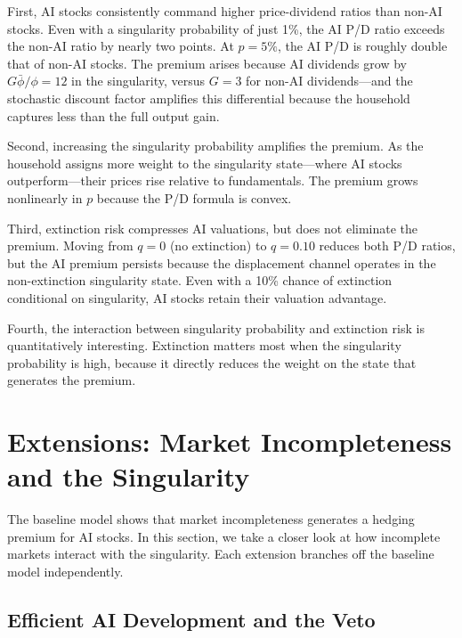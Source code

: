 \documentclass[12pt]{article}
\begin{document}
First, AI stocks consistently command higher price-dividend ratios than non-AI stocks. Even with a singularity probability of just 1\%, the AI P/D ratio exceeds the non-AI ratio by nearly two points. At $p = 5\%$, the AI P/D is roughly double that of non-AI stocks. The premium arises because AI dividends grow by $G\bar{\phi}/\phi = 12$ in the singularity, versus $G = 3$ for non-AI dividends---and the stochastic discount factor amplifies this differential because the household captures less than the full output gain.

Second, increasing the singularity probability amplifies the premium. As the household assigns more weight to the singularity state---where AI stocks outperform---their prices rise relative to fundamentals. The premium grows nonlinearly in $p$ because the P/D formula is convex.

Third, extinction risk compresses AI valuations, but does not eliminate the premium. Moving from $q = 0$ (no extinction) to $q = 0.10$ reduces both P/D ratios, but the AI premium persists because the displacement channel operates in the non-extinction singularity state. Even with a 10\% chance of extinction conditional on singularity, AI stocks retain their valuation advantage.

Fourth, the interaction between singularity probability and extinction risk is quantitatively interesting. Extinction matters most when the singularity probability is high, because it directly reduces the weight on the state that generates the premium.


\section{Extensions: Market Incompleteness and the Singularity}

The baseline model shows that market incompleteness generates a hedging premium for AI stocks. In this section, we take a closer look at how incomplete markets interact with the singularity. Each extension branches off the baseline model independently.

\subsection{Efficient AI Development and the Veto}
\end{document}
